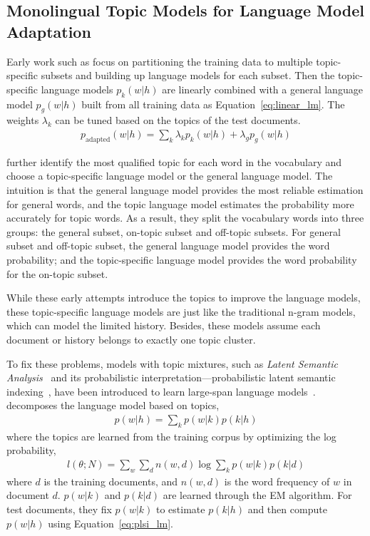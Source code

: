 

\subsection{Monolingual Topic Models for Language Model Adaptation}

Early work such as \citet{Clarkson-1997,Seymore-1997,Kneser-1997,Iyer-1999} focus on partitioning the training data to multiple topic-specific subsets and building up language models for each subset. Then the topic-specific language models $p_k(w|h)$ are linearly combined with a general language model $p_g(w|h)$ built from all training data as Equation~\ref{eq:linear_lm}. The weights $\lambda_k$ can be tuned based on the topics of the test documents.
\begin{align}
\label{eq:linear_lm}
p_\textrm{adapted}(w|h) = \sum_k \lambda_k p_k(w|h) + \lambda_g p_g(w|h)
\end{align}

\citet{Seymore-1998} further identify the most qualified topic for each word in the vocabulary and choose a topic-specific language model or the general language model. The intuition is that the general language model provides the most reliable estimation for general words, and the topic language model estimates the probability more accurately for topic words. As a result, they split the vocabulary words into three groups: the general subset, on-topic subset and off-topic subsets. For general subset and off-topic subset, the general language model provides the word probability; and the topic-specific language model provides the word probability for the on-topic subset.

While these early attempts introduce the topics to improve the language models, these topic-specific language models are just like the traditional n-gram models, which can model the limited history. Besides, these models assume each document or history belongs to exactly one topic cluster.

To fix these problems, models with topic mixtures, such as  \emph{Latent Semantic Analysis}~\citep[\textsc{lsa}]{deerwester-90} and its probabilistic interpretation---probabilistic latent semantic indexing~\citep[\textsc{plsi}]{hofmann-99}, have been introduced to learn large-span language models~\citep{Bellegarda-1997,Coccaro-1998,Gildea-1999}. \citet{Gildea-1999} decomposes the language model based on topics,
\begin{align}
\label{eq:plsi_lm}
p(w|h) = \sum_k p(w|k) p(k|h)
\end{align}
where the topics are learned from the training corpus by optimizing the log probability,
\begin{align}
l(\theta; N) = \sum_w \sum_d n(w,d) \log \sum_k p(w|k) p(k|d)
\end{align}
where $d$ is the training documents, and $n(w,d)$ is the word frequency of $w$ in document $d$. $p(w|k)$ and $p(k|d)$ are learned through the EM algorithm. For test documents, they fix $p(w|k)$ to estimate $p(k|h)$ and then compute $p(w|h)$ using Equation~\ref{eq:plsi_lm}. 


